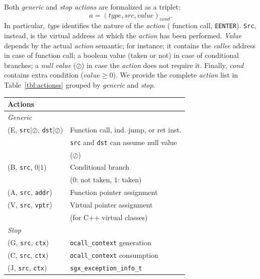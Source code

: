 Both \emph{generic} and \emph{stop actions} are formalized as a triplet:
$$
a = (type, src, value)_{cond}.
$$
In particular, \emph{type} identifies the nature of the \emph{action} (\eg 
function call, \texttt{EENTER}).
\texttt{Src}, instead, is the virtual address at which the \emph{action} has 
been performed.
\emph{Value} depends by the actual \emph{action} semantic; for instance; it 
contains the \emph{callee} address in case of function call; a boolean value 
(\ie taken or not) in case of conditional branches; a \emph{null} \emph{value} 
(\ie $\oslash$) in case the \emph{action} does not require it.
Finally, \emph{cond} contains extra condition (\eg $value \ge 0$).
We provide the complete \emph{action} list in Table~\ref{tbl:actionss} grouped 
by \emph{generic} and \emph{stop}.


\begin{table}[t]
	\centering
	\begin{tabular}{ll}
		\toprule 
		\multicolumn{2}{l}{\textbf{Actions}} \\ \midrule
		\multicolumn{2}{l}{\emph{Generic}} \\ \midrule
		(E, \texttt{src}|$\oslash$, \texttt{dst}|$\oslash$) & Function 
		call, ind. jump, or ret inst. \\ 
		& \texttt{src} and \texttt{dst} can assume null value \\ 
		& (\ie $\oslash$) \\ %
		(B, \texttt{src}, $0|1$) & Conditional branch \\
		& ($0$: not taken, $1$: taken) \\ 
		(A, \texttt{src}, \texttt{addr}) & Function pointer assignment \\ 
		(V, \texttt{src}, \texttt{vptr}) & Virtual pointer assignment \\
		& (for C++ virtual classes) \\ \midrule
		\multicolumn{2}{l}{\emph{Stop}} \\ \midrule
		(G, \texttt{src}, \texttt{ctx}) & \texttt{ocall\_context} 
		generation  \\ 
		(C, \texttt{src}, \texttt{ctx}) & \texttt{ocall\_context} 
		consumption \\ 
		(J, \texttt{src}, \texttt{ctx}) & 
		\texttt{sgx\_exception\_info\_t} \\

\end{tabular}
\end{table}
